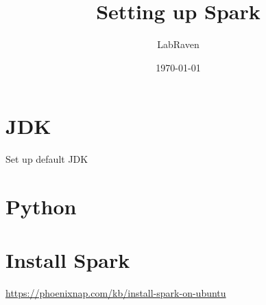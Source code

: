 \documentclass[twocolumn]{IEEEtran}
\author{LabRaven}
\date{\today}
\title{Setting up Spark}
\begin{document}
\maketitle
\tableofcontents


\section{JDK}
\label{sec:orgb8ea893}
Set up default JDK
\section{Python}
\label{sec:org6abf670}
\section{Install Spark}
\label{sec:orgf2dc3d2}
\url{https://phoenixnap.com/kb/install-spark-on-ubuntu}
\end{document}
